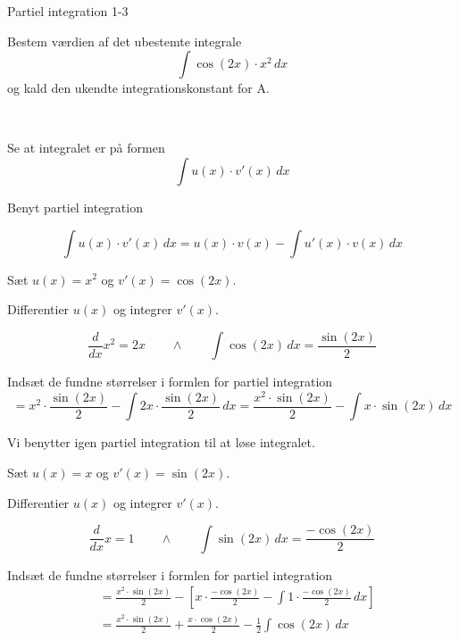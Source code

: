 \documentclass{article}
\begin{document}
\newpage

\begin{exercise}{Partiel integration 1-3}
	
	
	Bestem værdien af det ubestemte integrale
	\[
	\int \cos(2x) \cdot x^2 \, dx
	\]
	og kald den ukendte integrationskonstant for A.
	
	 \\
	
	
	\hint
	
	Se at integralet er på formen
	\[
	\int u(x) \cdot v'(x) \, dx
	\]
	
	\hint
	
	Benyt partiel integration
	
	\hint
	\[
	\int u(x) \cdot v'(x)\, dx = u(x) \cdot v(x) - \int u'(x) \cdot v(x) \, dx
	\]
	\hint
	
	Sæt $u(x) = x^2$ og $v'(x) = \cos(2x)$.
	
	
	\hint
	
	Differentier $u(x)$ og integrer $v'(x)$.
	
	\hint
	\[
	\frac{d}{dx}x^2 = 2x \qquad \wedge \qquad \int \cos(2x) \, dx = \frac{\sin(2x)}{2}
	\]
	
	\hint
	
	Indsæt de fundne størrelser i formlen for partiel integration
	\[
	= x^2 \cdot  \frac{\sin(2x)}{2} - \int 2x \cdot  \frac{\sin(2x)}{2} \, dx = \frac{x^2 \cdot \sin(2x)}{2} - \int x \cdot \sin(2x) \, dx 
	\]
	
	\hint
	
	Vi benytter igen partiel integration til at løse integralet.
	
	\hint
	
	Sæt $u(x) = x$ og $v'(x) = \sin(2x)$.
	
	
	\hint
	
	Differentier $u(x)$ og integrer $v'(x)$.
	
	\hint
	\[
	\frac{d}{dx}x = 1 \qquad \wedge \qquad \int \sin(2x) \, dx = \frac{-\cos(2x)}{2}
	\]
	
	\hint
	
	Indsæt de fundne størrelser i formlen for partiel integration
	\begin{align*}
	&= \frac{x^2 \cdot \sin(2x)}{2} - \left[ x \cdot \frac{-\cos(2x)}{2} - \int 1 \cdot \frac{-\cos(2x)}{2} \, dx \right] \\
	&= \frac{x^2 \cdot \sin(2x)}{2} +  \frac{x \cdot \cos(2x)}{2} -  \frac{1}{2}\int \cos(2x)\, dx
	\end{align*}
	

\end{exercise}
\end{document}
